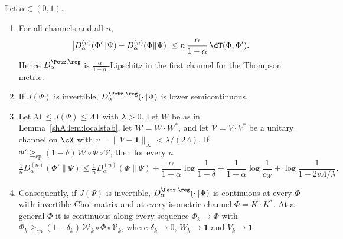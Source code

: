 \begin{theorem}\label{shA:thm:petzfirst}
Let $\alpha\in(0,1)$.
\begin{enumerate}[label=(\alph*)]
\item For all channels and all $n$,
\[
\big|D^{(n)}_\alpha(\Phi'\|\Psi)-D^{(n)}_\alpha(\Phi\|\Psi)\big|\le n\,\frac{\alpha}{1-\alpha}\,\dT(\Phi,\Phi').
\]
Hence $D^{\Petz,\reg}_\alpha$ is $\frac{\alpha}{1-\alpha}$-Lipschitz in the first channel for the Thompson metric.
\item If $J(\Psi)$ is invertible, $D^{\Petz,\reg}_\alpha(\cdot\|\Psi)$ is lower semicontinuous.
\item Let $\lambda\mathbf 1\le J(\Psi)\le\Lambda\mathbf 1$ with $\lambda>0$. Let $W$ be as in Lemma~\ref{shA:lem:localstab}, let $\mathcal W=W\cdot W^*$, and let $\mathcal V=V\cdot V^*$ be a unitary channel on $\cX$ with $v=\|V-\mathbf 1\|_\infty<\lambda/(2\Lambda)$. If $\Phi'\ge_{\mathrm{cp}}(1-\delta)\,\mathcal W\circ\Phi\circ\mathcal V$, then for every $n$
\[
\tfrac1nD^{(n)}_\alpha(\Phi'\|\Psi)\le\tfrac1nD^{(n)}_\alpha(\Phi\|\Psi)+\frac{\alpha}{1-\alpha}\log\frac1{1-\delta}+\frac1{1-\alpha}\log\frac1{c_W}+\log\frac1{1-2v\Lambda/\lambda}.
\]
\item Consequently, if $J(\Psi)$ is invertible, $D^{\Petz,\reg}_\alpha(\cdot\|\Psi)$ is continuous at every $\Phi$ with invertible Choi matrix and at every isometric channel $\Phi=K\cdot K^*$. At a general $\Phi$ it is continuous along every sequence $\Phi_k\to\Phi$ with $\Phi_k\ge_{\mathrm{cp}}(1-\delta_k)\,\mathcal W_k\circ\Phi\circ\mathcal V_k$, where $\delta_k\to0$, $W_k\to\mathbf 1$ and $V_k\to\mathbf 1$.
\end{enumerate}
\end{theorem}

